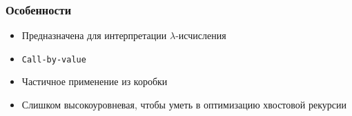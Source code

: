 \begin{frame}
  \frametitle{Особенности}
  \begin{itemize}
    \item Предназначена для интерпретации $\lambda$-исчисления
    \item \texttt{Call-by-value}
    \item Частичное применение из коробки
    \item Слишком высокоуровневая, чтобы уметь в оптимизацию хвостовой рекурсии
  \end{itemize}
\end{frame}